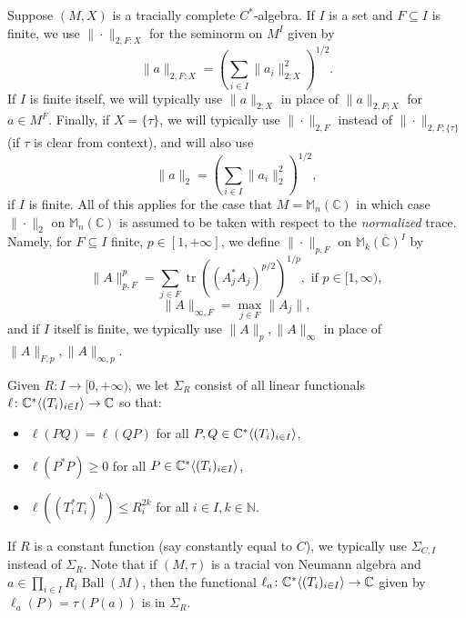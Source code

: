 \documentclass[10pt]{amsart}
\newtheorem{prop}[thm]{Proposition}
\theoremstyle{definition}
\numberwithin{equation}{section}
\newcommand{\bC}{{\mathbb C}}
\newcommand{\bM}{{\mathbb M}}
\newcommand{\bN}{{\mathbb N}}
\newcommand{\bR}{{\mathbb R}}
\DeclareMathOperator{\tr}{tr}
\DeclareMathOperator{\Ball}{Ball}
\DeclareMathOperator{\spec}{spec}
\DeclareMathOperator{\Lip}{Lip}
\DeclarePairedDelimiter{\ip}{\langle}{\rangle}
\begin{document}


Suppose $(M,X)$ is a tracially complete $C^{*}$-algebra. If $I$ is a set and $F\subseteq I$ is finite, we use $\|\cdot\|_{2,F:X}$ for the seminorm on $M^{I}$ given by 
\[\|a\|_{2,F;X}=\left(\sum_{i\in I}\|a_{i}\|_{2;X}^{2}\right)^{1/2}.\]
If $I$ is finite itself, we will typically use $\|a\|_{2;X}$ in place of $\|a\|_{2,F;X}$ for $a\in M^{F}$. Finally, if $X=\{\tau\}$, we will typically use $\|\cdot\|_{2,F}$ instead of $\|\cdot\|_{2,F;\{\tau\}}$ (if $\tau$ is clear from context), and will also use 
\[\|a\|_{2}=\left(\sum_{i\in I}\|a_{i}\|_{2}^{2}\right)^{1/2},\]
if $I$ is finite. All of this applies for the case that $M=\bM_{n}(\bC)$ in which case $\|\cdot\|_{2}$ on $\bM_{n}(\bC)$ is assumed to be taken with respect to the \emph{normalized} trace. 
Namely, for $F\subseteq I$ finite, $p\in [1,+\infty]$, we define $\|\cdot\|_{p,F}$ on $\bM_{k}(\bC)^{I}$ by
\[\|A\|_{p,F}^{p}=\sum_{j\in F}\tr((A_{j}^{*}A_{j})^{p/2})^{1/p}, \text{ if $p\in [1,\infty)$},\]
\[\|A\|_{\infty,F}=\max_{j\in F}\|A_{j}\|,\]
and if $I$ itself is finite, we typically use $\|A\|_{p},\|A\|_{\infty}$ in place of $\|A\|_{F,p},\|A\|_{\infty,p}$.



Given $R\colon I\to [0,+\infty)$, we let $\Sigma_{R}$ consist of all linear functionals $\ell\colon \bC^{*}\ip{(T_{i})_{i\in I}}\to \bC$ so that:
\begin{itemize}
    \item $\ell(PQ)=\ell(QP)$ for all $P,Q\in \bC^{*}\ip{(T_{i})_{i\in I}}$,
    \item $\ell(P^{*}P)\geq 0$ for all $P\in \bC^{*}\ip{(T_{i})_{i\in I}}$,
    \item $\ell((T_{i}^{*}T_{i})^{k})\leq R_{i}^{2k}$ for all $i\in I,k\in \bN$. 
\end{itemize}
If $R$ is a constant function (say constantly equal to $C$), we typically use $\Sigma_{C,I}$ instead of $\Sigma_{R}$. Note that if $(M,\tau)$ is a tracial von Neumann algebra and $a\in \prod_{i\in I}R_{i}\Ball(M)$, then the functional $\ell_{a}\colon \bC^{*}\ip{(T_{i})_{i\in I}}\to\bC$ given by $\ell_{a}(P)=\tau(P(a))$ is in $\Sigma_{R}$. 
\end{document}
